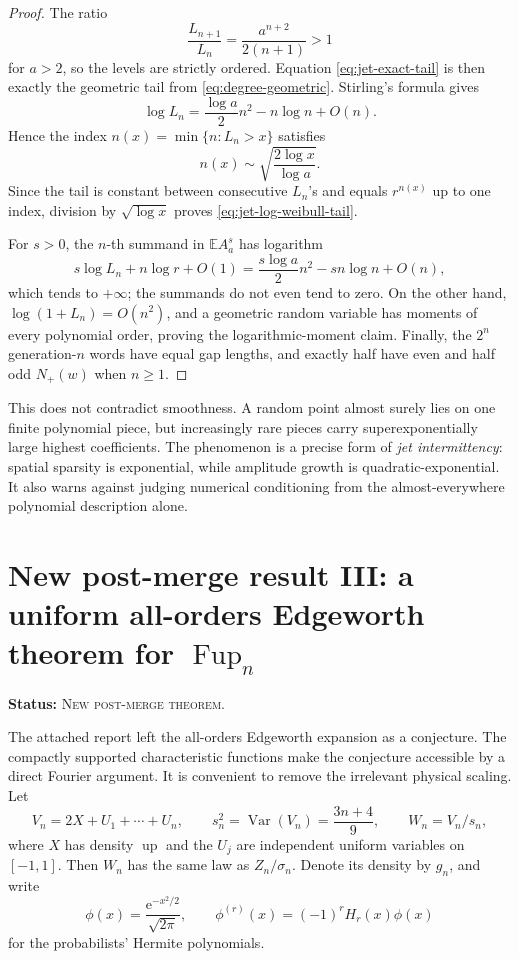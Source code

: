 \documentclass[11pt,oneside]{article}
\theoremstyle{definition}
\theoremstyle{remark}
\newcommand{\Up}{\operatorname{up}}
\newcommand{\Fup}{\operatorname{Fup}}
\newcommand{\E}{\mathbb{E}}
\newcommand{\Var}{\operatorname{Var}}
\newcommand{\e}{\mathrm e}
\newcommand{\DerivedStatus}{\textcolor{DerivedPurple}{\textsc{New post-merge theorem}}}
\newcommand{\status}[1]{\par\smallskip\noindent\textbf{Status:} #1.\par\smallskip}
\begin{document}
\begin{proof}
The ratio
\begin{equation}
  \frac{L_{n+1}}{L_n}=\frac{a^{n+2}}{2(n+1)}>1
  \label{eq:Ln-ratio}
\end{equation}
for \(a>2\), so the levels are strictly ordered.  Equation \eqref{eq:jet-exact-tail} is then
exactly the geometric tail from \eqref{eq:degree-geometric}.  Stirling's formula gives
\begin{equation}
  \log L_n=\frac{\log a}{2}n^2-n\log n+O(n).
  \label{eq:Ln-log-asymptotic}
\end{equation}
Hence the index \(n(x)=\min\{n:L_n>x\}\) satisfies
\[
 n(x)\sim\sqrt{\frac{2\log x}{\log a}}.
\]
Since the tail is constant between consecutive \(L_n\)'s and equals \(r^{n(x)}\) up to one
index, division by \(\sqrt{\log x}\) proves \eqref{eq:jet-log-weibull-tail}.

For \(s>0\), the \(n\)-th summand in \(\E A_a^s\) has logarithm
\[
 s\log L_n+n\log r+O(1)=\frac{s\log a}{2}n^2-sn\log n+O(n),
\]
which tends to \(+\infty\); the summands do not even tend to zero.  On the other hand,
\(\log(1+L_n)=O(n^2)\), and a geometric random variable has moments of every polynomial
order, proving the logarithmic-moment claim.  Finally, the \(2^n\) generation-\(n\) words have
equal gap lengths, and exactly half have even and half odd \(N_+(w)\) when \(n\ge1\).
\end{proof}

This does not contradict smoothness.  A random point almost surely lies on one finite polynomial
piece, but increasingly rare pieces carry superexponentially large highest coefficients.  The
phenomenon is a precise form of \emph{jet intermittency}: spatial sparsity is exponential, while
amplitude growth is quadratic-exponential.  It also warns against judging numerical conditioning
from the almost-everywhere polynomial description alone.

\section{New post-merge result III: a uniform all-orders Edgeworth theorem for \texorpdfstring{\(\Fup_n\)}{Fup-n}}
\label{sec:fup-edgeworth-theorem}
\status{\DerivedStatus}

The attached report left the all-orders Edgeworth expansion as a conjecture.  The compactly
supported characteristic functions make the conjecture accessible by a direct Fourier argument.
It is convenient to remove the irrelevant physical scaling.  Let
\begin{equation}
 V_n=2X+U_1+\cdots+U_n,
 \qquad s_n^2=\Var(V_n)=\frac{3n+4}{9},
 \qquad W_n=V_n/s_n,
 \label{eq:Vn-standardization}
\end{equation}
where \(X\) has density \(\Up\) and the \(U_j\) are independent uniform variables on
\([-1,1]\).  Then \(W_n\) has the same law as \(Z_n/\sigma_n\).  Denote its density by
\(g_n\), and write
\[
 \phi(x)=\frac{\e^{-x^2/2}}{\sqrt{2\pi}},
 \qquad \phi^{(r)}(x)=(-1)^rH_r(x)\phi(x)
\]
for the probabilists' Hermite polynomials.
\end{document}
